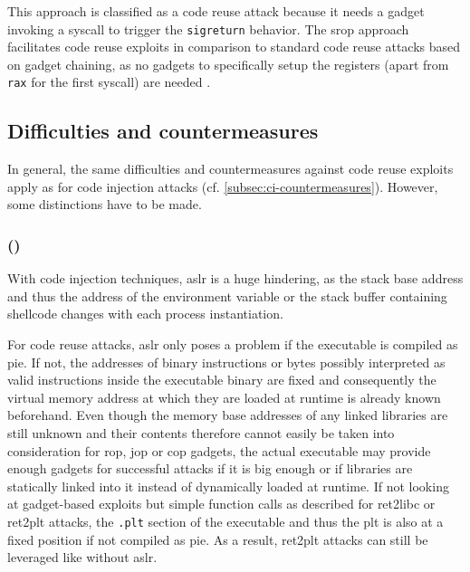 This approach is classified as a code reuse attack because it needs a gadget invoking a \gls{syscall} to trigger the \texttt{sigreturn} behavior.
The \gls{srop} approach facilitates code reuse exploits in comparison to standard code reuse attacks based on gadget chaining, as no gadgets to specifically setup the registers (apart from \texttt{rax} for the first \gls{syscall}) are needed \cite{Bosman2014}.

\subsection{Difficulties and countermeasures}
\label{subsec:cr-countermeasures}

In general, the same difficulties and countermeasures against code reuse exploits apply as for code injection attacks (cf. \cref{subsec:ci-countermeasures}).
However, some distinctions have to be made.

\subsubsection{ ()}
\label{subsubsec:cr-aslr}

With code injection techniques, \gls{aslr} is a huge hindering, as the stack base address and thus the address of the environment variable or the stack buffer containing shellcode changes with each process instantiation.

For code reuse attacks, \gls{aslr} only poses a problem if the executable is compiled as \gls{pie}.
If not, the addresses of binary instructions or bytes possibly interpreted as valid instructions inside the executable binary are fixed and consequently the virtual memory address at which they are loaded at runtime is already known beforehand.
Even though the memory base addresses of any linked libraries are still unknown and their contents therefore cannot easily be taken into consideration for \gls{rop}, \gls{jop} or \gls{cop} gadgets, the actual executable may provide enough gadgets for successful attacks if it is big enough or if libraries are statically linked into it instead of dynamically loaded at runtime.
If not looking at gadget-based exploits but simple function calls as described for \gls{ret2libc} or \gls{ret2plt} attacks, the \texttt{.plt} section of the executable and thus the \gls{plt} is also at a fixed position if not compiled as \gls{pie}.
As a result, \gls{ret2plt} attacks can still be leveraged like without \gls{aslr}.

